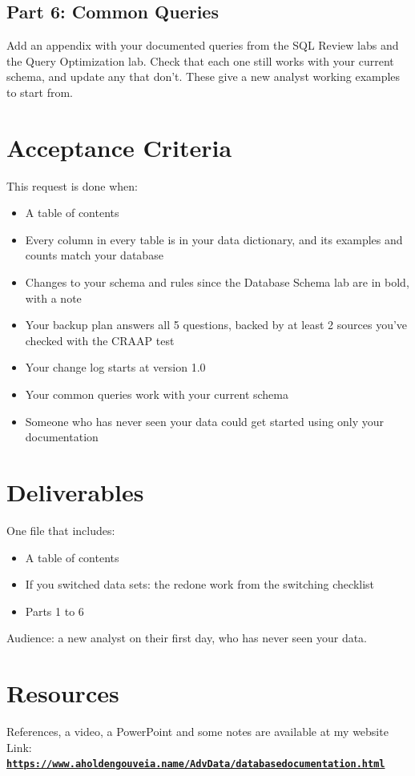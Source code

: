 \documentclass[12pt]{article}
\begin{document}
\subsection*{Part 6: Common Queries}
Add an appendix with your documented queries from the SQL Review labs and the Query Optimization lab. Check that each one still works with your current schema, and update any that don't. These give a new analyst working examples to start from.

\section*{Acceptance Criteria}
This request is done when:
\begin{itemize}
    \item A table of contents
    \item Every column in every table is in your data dictionary, and its examples and counts match your database
    \item Changes to your schema and rules since the Database Schema lab are in bold, with a note
    \item Your backup plan answers all 5 questions, backed by at least 2 sources you've checked with the CRAAP test
    \item Your change log starts at version 1.0
    \item Your common queries work with your current schema
    \item Someone who has never seen your data could get started using only your documentation
\end{itemize}

\section*{Deliverables}
One file that includes:
\begin{itemize}
    \item A table of contents
    \item If you switched data sets: the redone work from the switching checklist
    \item Parts 1 to 6
\end{itemize}

Audience: a new analyst on their first day, who has never seen your data.

\section*{Resources}
References, a video, a PowerPoint and some notes are available at my website
Link: \href{https://www.aholdengouveia.name/AdvData/databasedocumentation.html}{\textbf{\nolinkurl{https://www.aholdengouveia.name/AdvData/databasedocumentation.html}}}
\end{document}
